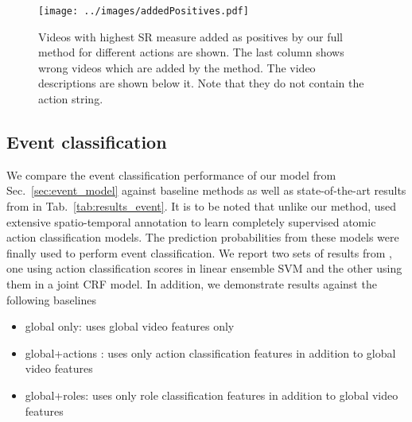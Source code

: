 \documentclass[10pt,twocolumn,letterpaper]{article}
\begin{document}
\begin{figure}[ht]
\centering
   \texttt{[image: ../images/addedPositives.pdf]}
      \caption{Videos with highest SR measure added as positives by our full method for different actions are shown. The last column shows wrong videos which are added by the method. The video descriptions are shown below it. Note that they do not contain the action string.}
\label{fig:added_positives}
\end{figure}

 

\subsection{Event classification}
We compare the event classification performance of our model from Sec.~\ref{sec:event_model} against baseline methods as well as state-of-the-art results from \cite{Izadinia_ECCV12} in Tab.~\ref{tab:results_event}. It is to be noted that unlike our method, \cite{Izadinia_ECCV12} used extensive spatio-temporal annotation to learn completely supervised atomic action classification models. The prediction probabilities from these models were finally used to perform event classification. We report two sets of results from \cite{Izadinia_ECCV12}, one using action classification scores in linear ensemble SVM and the other using them in a joint CRF model. In addition, we demonstrate results against the following baselines

\vspace*{-3pt}
\begin{itemize}
 \item global only: uses global video features only \vspace*{-9pt}
 \item global+actions : uses only action classification features in addition to global video features \vspace*{-9pt}
 \item global+roles: uses only role classification features in addition to global video features \vspace*{-5pt}
\end{itemize}
\vspace*{-3pt}
\end{document}
